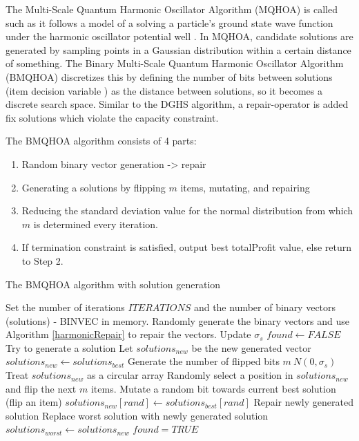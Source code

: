 \documentclass[titlepage]{article}
\begin{document}
The Multi-Scale Quantum Harmonic Oscillator Algorithm (MQHOA) is called such as it follows a model of a solving a particle's ground state wave function under the harmonic oscillator potential well \cite{BMQHOA-article} . In MQHOA, candidate solutions are generated by sampling points in a Gaussian distribution within a certain distance of something. The Binary Multi-Scale Quantum Harmonic Oscillator Algorithm (BMQHOA) discretizes this by defining the number of bits between solutions (item decision variable ) as the distance between solutions, so it becomes a discrete search space. Similar to the DGHS algorithm, a repair-operator is added fix solutions which violate the capacity constraint. 

The BMQHOA algorithm consists of 4 parts:
\begin{enumerate}
    \item Random binary vector generation -> repair
    \item Generating a solutions by flipping $m$ items, mutating, and repairing
    \item Reducing the standard deviation value for the normal distribution from which $m$ is determined every iteration.
    \item If termination constraint is satisfied, output best totalProfit value, else return to Step 2.
\end{enumerate}

\begin{breakablealgorithm}
\caption{The BMQHOA algorithm with solution generation}\label{BMQHOA}
    \begin{algorithmic}[1]
        \State Set the number of iterations $ITERATIONS$ and the number of binary vectors (solutions) - BINVEC in memory.
        \State Randomly generate the binary vectors and use Algorithm \ref{harmonicRepair} to repair the vectors. 
            \State Update $\sigma_{s}$
            \State $found \gets FALSE$
                \State Try to generate a solution
                \State Let $solutions_{new}$ be the new generated vector 
                \State $solutions_{new} \gets solutions_{best}$
                \State Generate the number of flipped bits $m ~ N(0, \sigma_{s})$
                \State Treat $solutions_{new}$ as a circular array
                \State Randomly select a position in $solutions_{new}$ and flip the next $m$ items.
                \State Mutate a random bit towards current best solution (flip an item)
                \State $solutions_{new}[rand] \gets solutions_{best}[rand]$
                \State Repair newly generated solution
                    \State Replace worst solution with newly generated solution
                    \State $solutions_{worst} \gets solutions_{new}$
                    \State $found = TRUE$
                \EndIf
            \EndWhile
        \EndWhile
    \end{algorithmic}
\end{breakablealgorithm}
\vskip 0.5cm
\end{document}
